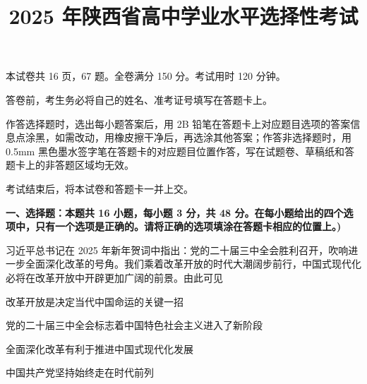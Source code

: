 \documentclass{exam-zh}
\title{2025 年陕西省高中学业水平选择性考试}
\begin{document}
\secret

\maketitle

本试卷共 16 页，67 题。全卷满分 150 分。考试用时 120 分钟。

\begin{notice}[][itemsep=0pt, parsep=0pt, topsep=0pt, partopsep=0pt]
\item 答卷前，考生务必将自己的姓名、准考证号填写在答题卡上。
\item 作答选择题时，选出每小题答案后，用 2B 铅笔在答题卡上对应题目选项的答案信息点涂黑，如需改动，用橡皮擦干净后，再选涂其他答案；作答非选择题时，用 0.5mm 黑色墨水签字笔在答题卡的对应题目位置作答，写在试题卷、草稿纸和答题卡上的非答题区域均无效。
\item 考试结束后，将本试卷和答题卡一并上交。
\end{notice}

\begin{flushleft}
{\bfseries 一、选择题：本题共 16 小题，每小题 3 分，共 48 分。在每小题给出的四个选项中，只有一个选项是正确的。请将正确的选项填涂在答题卡相应的位置上。)}
\end{flushleft}
\vspace{-1em}

\begin{question}
习近平总书记在 2025 年新年贺词中指出：党的二十届三中全会胜利召开，吹响进一步全面深化改革的号角。我们乘着改革开放的时代大潮阔步前行，中国式现代化必将在改革开放中开辟更加广阔的前景。由此可见

 改革开放是决定当代中国命运的关键一招

 党的二十届三中全会标志着中国特色社会主义进入了新阶段

 全面深化改革有利于推进中国式现代化发展

 中国共产党坚持始终走在时代前列

\begin{choices}
\item {}
\item {}
\item {}
\item {}
\end{choices}
\end{question}
\end{document}
